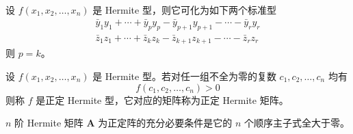 \begin{theorem}
    设 $f(x_1, x_2, \ldots, x_n)$ 是 Hermite 型，则它可化为如下两个标准型
    \begin{gather*}
        \bar{y}_{1}y_{1} + \cdots + \bar{y}_{p}y_{p} - \bar{y}_{p + 1}y_{p + 1} - \cdots  - \bar{y}_{r}y_{r} \\
        \bar{z}_{1}z_{1} + \cdots + \bar{z}_{k}z_{k} - \bar{z}_{k + 1}z_{k + 1} - \cdots  - \bar{z}_{r}z_{r}
    \end{gather*}
    则 $p = k$。
\end{theorem}

\begin{definition}
    设 $f(x_1, x_2, \ldots, x_n)$ 是 Hermite 型。若对任一组不全为零的复数 $c_1, c_2, \ldots, c_n$ 均有
    \[
        f(c_1, c_2, \ldots, c_n) > 0
    \]
    则称 $f$ 是正定 Hermite 型，它对应的矩阵称为正定 Hermite 矩阵。
\end{definition}

\begin{theorem}
    $n$ 阶 Hermite 矩阵 $\bm{A}$ 为正定阵的充分必要条件是它的 $n$ 个顺序主子式全大于零。
\end{theorem}





